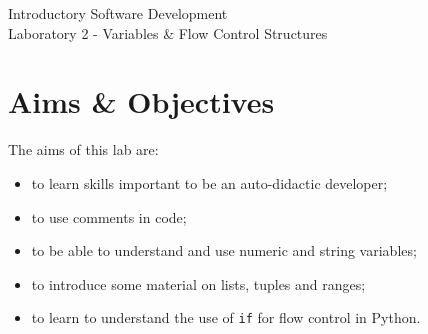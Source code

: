 \documentclass[12pt,oneside]{cttutorial}
\begin{document}
\tutorialextra{}


 

\newcommand{\alert}[1]
{\marginpar
  {\makebox[0 pt][l]
    {\texttt{[image: ../../Figures/png/warning.png]}
  }
  \parbox{2 cm}{{\sffamily \bfseries \tiny #1}}}}


\renewcommand{\baselinestretch}{1.5}
\textwidth=15cm

\newcommand{\I}{j}

\begin{center}
\begin{bfseries}
Introductory Software Development\\Laboratory 2 - Variables \& Flow Control
Structures
\end{bfseries}
\end{center}

\section{Aims \& Objectives}

The aims of this lab are:

\begin{itemize}
\item to learn skills important to be an auto-didactic developer;
\item to use comments in code;
\item to be able to understand and use numeric and string variables;
\item to introduce some material on lists, tuples and ranges;
\item to learn to understand the use of \lstinline!if! for flow control in Python.
\end{itemize}
\end{document}
